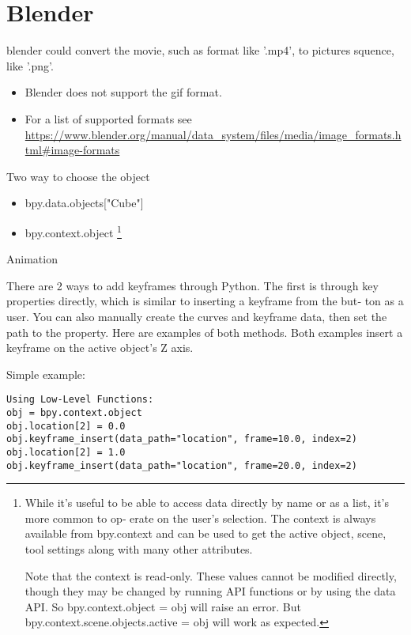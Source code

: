 \chapter{Blender}

blender could convert the movie, such as format like '.mp4', to pictures squence, like '.png'.

\begin{itemize}
\item Blender does not support the gif format.
\item For a list of supported formats see \url{https://www.blender.org/manual/data_system/files/media/image_formats.html#image-formats}
\end{itemize}


Two way to choose the object

\begin{itemize}
\item  bpy.data.objects["Cube"]
\item bpy.context.object \footnote{While it’s useful to be able to access data directly by name or as a list, it’s more common to op‐ erate on the user’s selection. The context is always available from bpy.context and can be used to get the active object, scene, tool settings along with many other attributes.

Note that the context is read-only. These values cannot be modified directly, though they may be changed by running API functions or by using the data API.
So bpy.context.object = obj will raise an error.
But bpy.context.scene.objects.active = obj will work as expected.
}
\end{itemize}

Animation

There are 2 ways to add keyframes through Python.
The first is through key properties directly, which is similar to inserting a keyframe from the but‐ ton as a user. You can also manually create the curves and keyframe data, then set the path to the property. Here are examples of both methods.
Both examples insert a keyframe on the active object’s Z axis.


Simple example:

\begin{verbatim}
Using Low-Level Functions:
obj = bpy.context.object
obj.location[2] = 0.0
obj.keyframe_insert(data_path="location", frame=10.0, index=2)
obj.location[2] = 1.0
obj.keyframe_insert(data_path="location", frame=20.0, index=2)
\end{verbatim}



